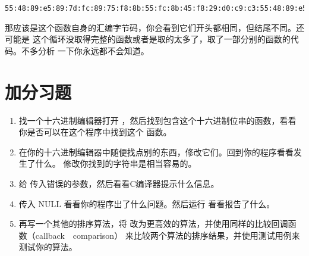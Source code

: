 \begin{Verbatim}
55:48:89:e5:89:7d:fc:89:75:f8:8b:55:fc:8b:45:f8:29:d0:c9:c3:55:48:89:e5:89:
\end{Verbatim}

那应该是这个函数自身的汇编字节码，你会看到它们开头都相同，但结尾不同。还可能是
这个循环没取得完整的函数或者是取的太多了，取了一部分别的函数的代码。不多分析
一下你永远都不会知道。

\section{加分习题}

\begin{enumerate}
\item 找一个十六进制编辑器打开 ，然后找到包含这个十六进制位串的函数，看看你是否可以在这个程序中找到这个
函数。
\item 在你的十六进制编辑器中随便找点别的东西，修改它们。回到你的程序看看发生了什么。
    修改你找到的字符串是相当容易的。
\item 给  传入错误的参数，然后看看C编译器提示什么信息。
\item 传入 NULL 看看你的程序出了什么问题。然后运行  看看报告了什么。
\item 再写一个其他的排序算法，将 改为更高效的算法，并使用同样的比较回调函数（callback　comparison） 来比较两个算法的排序结果，并使用测试用例来测试你的算法。
\end{enumerate}


